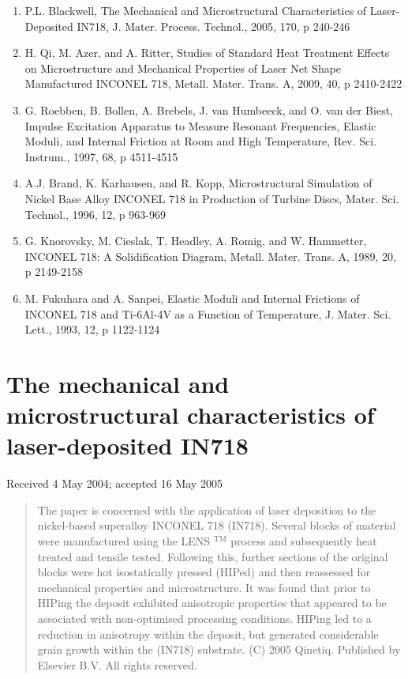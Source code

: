 \documentclass[10pt]{article}
\begin{document}
\begin{enumerate}
  \item P.L. Blackwell, The Mechanical and Microstructural Characteristics of Laser-Deposited IN718, J. Mater. Process. Technol., 2005, 170, p 240-246

  \item H. Qi, M. Azer, and A. Ritter, Studies of Standard Heat Treatment Effects on Microstructure and Mechanical Properties of Laser Net Shape Manufactured INCONEL 718, Metall. Mater. Trans. A, 2009, 40, p 2410-2422

  \item G. Roebben, B. Bollen, A. Brebels, J. van Humbeeck, and O. van der Biest, Impulse Excitation Apparatus to Measure Resonant Frequencies, Elastic Moduli, and Internal Friction at Room and High Temperature, Rev. Sci. Instrum., 1997, 68, p 4511-4515

  \item A.J. Brand, K. Karhausen, and R. Kopp, Microstructural Simulation of Nickel Base Alloy INCONEL 718 in Production of Turbine Discs, Mater. Sci. Technol., 1996, 12, p 963-969

  \item G. Knorovsky, M. Cieslak, T. Headley, A. Romig, and W. Hammetter, INCONEL 718: A Solidification Diagram, Metall. Mater. Trans. A, 1989, 20, p 2149-2158

  \item M. Fukuhara and A. Sanpei, Elastic Moduli and Internal Frictions of INCONEL 718 and Ti-6Al-4V as a Function of Temperature, J. Mater. Sci. Lett., 1993, 12, p 1122-1124

\end{enumerate}

\section*{The mechanical and microstructural characteristics of laser-deposited IN718 }
Received 4 May 2004; accepted 16 May 2005

\begin{abstract}
The paper is concerned with the application of laser deposition to the nickel-based superalloy INCONEL 718 (IN718). Several blocks of material were manufactured using the LENS ${ }^{\mathrm{TM}}$ process and subsequently heat treated and tensile tested. Following this, further sections of the original blocks were hot isostatically pressed (HIPed) and then reassessed for mechanical properties and microstructure. It was found that prior to HIPing the deposit exhibited anisotropic properties that appeared to be associated with non-optimised processing conditions. HIPing led to a reduction in anisotropy within the deposit, but generated considerable grain growth within the (IN718) substrate. (C) 2005 Qinetiq. Published by Elsevier B.V. All rights reserved.
\end{abstract}
\end{document}
